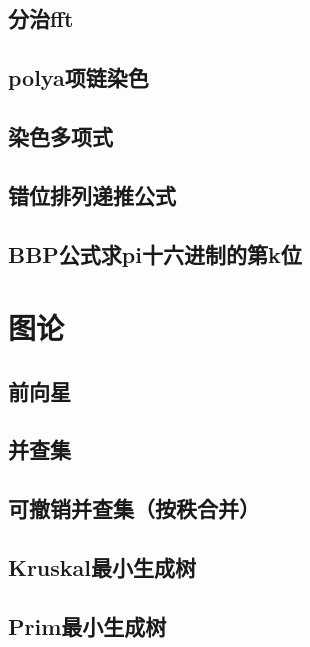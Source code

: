 \section{分治fft}
\raggedbottom
\hrulefill
\section{polya项链染色}
\raggedbottom
\hrulefill
\section{染色多项式}
\raggedbottom
\hrulefill
\section{	错位排列递推公式}
\raggedbottom
\hrulefill
\section{BBP公式求pi十六进制的第k位}
\raggedbottom
\hrulefill

\chapter{图论}
\section{前向星}
\raggedbottom
\hrulefill
\section{并查集}
\raggedbottom
\hrulefill
\section{可撤销并查集（按秩合并）}
\raggedbottom
\hrulefill
\section{Kruskal最小生成树}
\raggedbottom
\hrulefill
\section{Prim最小生成树}
\raggedbottom
\hrulefill
